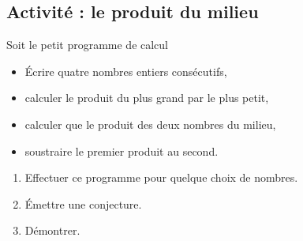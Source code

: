 
\subsection*{Activité : le produit du milieu}

Soit le petit programme de calcul
\begin{itemize}
    \item
        Écrire quatre nombres entiers consécutifs,
    \item
        calculer le produit du plus grand par le plus petit,
    \item
        calculer que le produit des deux nombres du milieu,
    \item
        soustraire le premier produit au second.
\end{itemize}
\begin{enumerate}
    \item
        Effectuer ce programme pour quelque choix de nombres. 
    \item
        Émettre une conjecture.
    \item
        Démontrer.
\end{enumerate}
